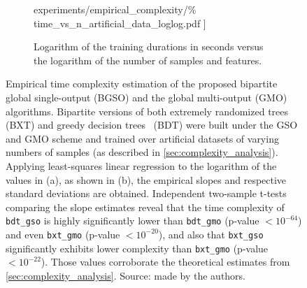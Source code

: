 \begin{figure}[h]
\begin{subfigure}{0.49\textwidth}
{            experiments/empirical\_complexity/\%
            time\_vs\_n\_artificial\_data\_loglog.pdf
        ]}
        \caption{Logarithm of the training durations in seconds versus the logarithm of the number of samples and features.}
    \end{subfigure}
    \caption{
        Empirical time complexity estimation of the proposed bipartite global single-output (BGSO) and the global multi-output (GMO)~\cite{pliakos2018global}
        algorithms. Bipartite versions of both extremely randomized trees~\cite{geurts2006extremely} (BXT) and greedy decision trees~\cite{breiman1984classification} (BDT) were built under the GSO and GMO scheme and trained over artificial datasets of varying numbers of samples (as described in \autoref{sec:complexity_analysis}). Applying least-squares linear regression to the logarithm of the values in (a), as shown in (b), the empirical slopes and respective standard deviations are obtained.
        Independent two-sample t-tests comparing the slope estimates reveal that the time complexity of \texttt{bdt\_gso} is highly significantly lower than \texttt{bdt\_gmo} (p-value $< 10^{-64}$) and even \texttt{bxt\_gmo} (p-value $< 10^{-20}$), and also that \texttt{bxt\_gso} significantly exhibits lower complexity than \texttt{bxt\_gmo} (p-value $< 10^{-22}$). Those values
        corroborate the theoretical estimates from \autoref{sec:complexity_analysis}.
        Source: made by the authors.
    }
    \label{fig:empirical_complexity}
\end{figure}


